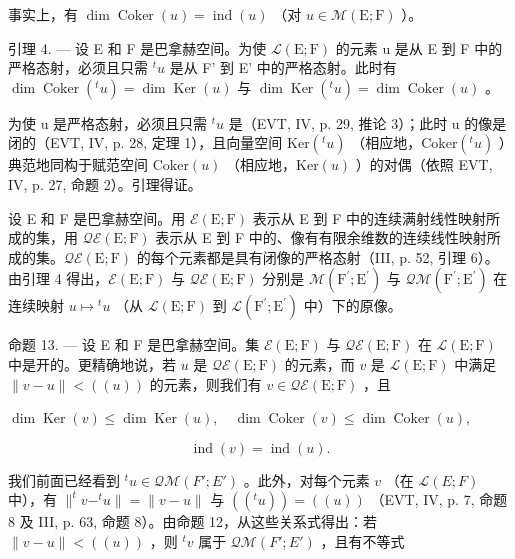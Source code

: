 事实上，有 \(\dim \operatorname{Coker}(u) = \operatorname{ind}(u)\) （对 \(u \in \mathcal{M}(\mathrm{E};\mathrm{F})\) ）。

引理 4. --- 设 E 和 F 是巴拿赫空间。为使 \(\mathcal{L}(\mathrm{E};\mathrm{F})\) 的元素 u 是从 E 到 F 中的严格态射，必须且只需 \(^{t}u\) 是从 F' 到 E' 中的严格态射。此时有 \(\dim \operatorname{Coker}(^{t}u)=\dim\operatorname{Ker}(u)\) 与 \(\dim\operatorname{Ker}(^{t}u)=\dim\operatorname{Coker}(u)\) 。

为使 u 是严格态射，必须且只需 \(^{t}u\) 是（EVT, IV, p. 29, 推论 3）；此时 u 的像是闭的（EVT, IV, p. 28, 定理 1），且向量空间 \(\mathrm{Ker}(^{t}u)\) （相应地，\(\mathrm{Coker}(^{t}u)\) ）典范地同构于赋范空间 \(\mathrm{Coker}(u)\) （相应地，\(\mathrm{Ker}(u)\) ）的对偶（依照 EVT, IV, p. 27, 命题 2）。引理得证。

设 E 和 F 是巴拿赫空间。用 \(\mathcal{E}(\mathrm{E};\mathrm{F})\) 表示从 E 到 F 中的连续满射线性映射所成的集，用 \(\mathcal{Q}\mathcal{E}(\mathrm{E};\mathrm{F})\) 表示从 E 到 F 中的、像有有限余维数的连续线性映射所成的集。\(\mathcal{Q}\mathcal{E}(\mathrm{E};\mathrm{F})\) 的每个元素都是具有闭像的严格态射（III, p. 52, 引理 6）。由引理 4 得出，\(\mathcal{E}(\mathrm{E};\mathrm{F})\) 与 \(\mathcal{Q}\mathcal{E}(\mathrm{E};\mathrm{F})\) 分别是 \(\mathcal{M}(\mathrm{F}^{\prime};\mathrm{E}^{\prime})\) 与 \(\mathcal{Q}\mathcal{M}(\mathrm{F}^{\prime};\mathrm{E}^{\prime})\) 在连续映射 \(u\mapsto{}^{t}u\) （从 \(\mathcal{L}(\mathrm{E};\mathrm{F})\) 到 \(\mathcal{L}(\mathrm{F}^{\prime};\mathrm{E}^{\prime})\) 中）下的原像。

命题 13. --- 设 E 和 F 是巴拿赫空间。集 \(\mathcal{E}(\mathrm{E};\mathrm{F})\) 与 \(\mathcal{Q}\mathcal{E}(\mathrm{E};\mathrm{F})\) 在 \(\mathcal{L}(\mathrm{E};\mathrm{F})\) 中是开的。更精确地说，若 \(u\) 是 \(\mathcal{Q}\mathcal{E}(\mathrm{E};\mathrm{F})\) 的元素，而 \(v\) 是 \(\mathcal{L}(\mathrm{E};\mathrm{F})\) 中满足 \(\| v - u\| < ((u))\) 的元素，则我们有 \(v \in \mathcal{Q}\mathcal{E}(\mathrm{E};\mathrm{F})\) ，且

\(\dim \operatorname{Ker}(v) \leqslant \dim \operatorname{Ker}(u), \quad \dim \operatorname{Coker}(v) \leqslant \dim \operatorname{Coker}(u),\)

\[
\operatorname{ind} (v) = \operatorname{ind} (u).
\]

我们前面已经看到 \(^{t}u \in \mathcal{Q}\mathcal{M}(F';E')\) 。此外，对每个元素 \(v\) （在 \(\mathcal{L}(E;F)\) 中），有 \(\|^{t}v - ^{t}u\| = \|v - u\|\) 与 \(((^{t}u)) = ((u))\) （EVT, IV, p. 7, 命题 8 及 III, p. 63, 命题 8）。由命题 12，从这些关系式得出：若 \(\|v - u\| < ((u))\) ，则 \(^{t}v\) 属于 \(\mathcal{Q}\mathcal{M}(F';E')\) ，且有不等式

